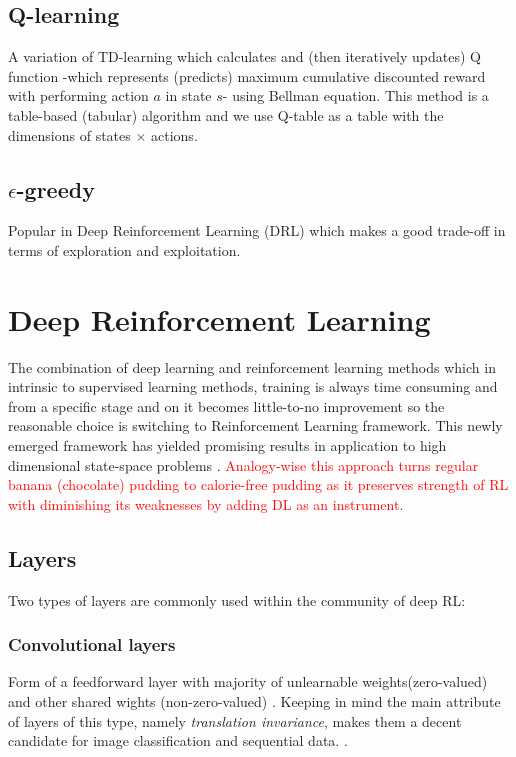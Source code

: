 \documentclass[a4paper,12pt]{article}
\begin{document}
\subsection{Q-learning}
A variation of TD-learning which calculates and (then iteratively updates) Q function -which represents (predicts) maximum cumulative discounted reward with performing action $a$ in state $s$- using Bellman equation. This method is a table-based (tabular) algorithm and we use Q-table as a table with the dimensions of states $\times$ actions.

\subsection{$\epsilon$-greedy}
Popular in Deep Reinforcement Learning (DRL) which makes a good trade-off in terms of exploration and exploitation.

\section{Deep Reinforcement Learning}
The combination of deep learning and reinforcement learning methods which in intrinsic to supervised learning methods, training is always time consuming and from a specific stage and on it becomes little-to-no improvement so the reasonable choice is switching to Reinforcement Learning framework. This newly emerged framework has yielded promising results in application to high dimensional state-space problems \cite{Francois-Lavet2018}. \textcolor{red}{ Analogy-wise this approach turns regular banana (chocolate) pudding to calorie-free pudding as it preserves strength of RL with diminishing its weaknesses by adding DL as an instrument.}

\subsection{Layers}
Two types of layers are commonly used within the community of deep RL:

\subsubsection{Convolutional layers}
Form of a feedforward layer with majority of unlearnable weights(zero-valued) and other shared wights (non-zero-valued) \cite{Francois-Lavet2018}. Keeping in mind the main attribute of layers of this type, namely \textit{translation invariance}, makes them a decent candidate for image classification and sequential data. \cite{lecun1995a, Francois-Lavet2018}.
\end{document}
